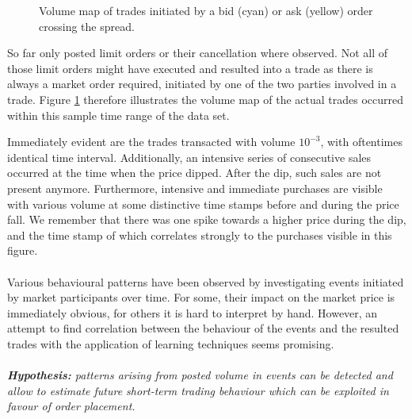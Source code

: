 \begin{figure}[H]
    \centering
    \caption{Volume map of trades initiated by a bid (cyan) or ask (yellow) order crossing the spread.}
    \label{fig:data-volmap-traded}
\end{figure}

So far only posted limit orders or their cancellation where observed.
Not all of those limit orders might have executed and resulted into a trade as there is always a market order required, initiated by one of the two parties involved in a trade.
Figure \ref{fig:data-volmap-traded} therefore illustrates the volume map of the actual trades occurred within this sample time range of the data set.

Immediately evident are the trades transacted with volume $10^{-3}$, with oftentimes identical time interval.
Additionally, an intensive series of consecutive sales occurred at the time when the price dipped.
After the dip, such sales are not present anymore.
Furthermore, intensive and immediate purchases are visible with various volume at some distinctive time stamps before and during the price fall.
We remember that there was one spike towards a higher price during the dip, and the time stamp of which correlates strongly to the purchases visible in this figure.
\\
\\
Various behavioural patterns have been observed by investigating events initiated by market participants over time.
For some, their impact on the market price is immediately obvious, for others it is hard to interpret by hand.
However, an attempt to find correlation between the behaviour of the events and the resulted trades with the application of learning techniques seems promising.
\\
\\
\textit{\textbf{Hypothesis:} patterns arising from posted volume in events can be detected and allow to estimate future short-term trading behaviour which can be exploited in favour of order placement.}

